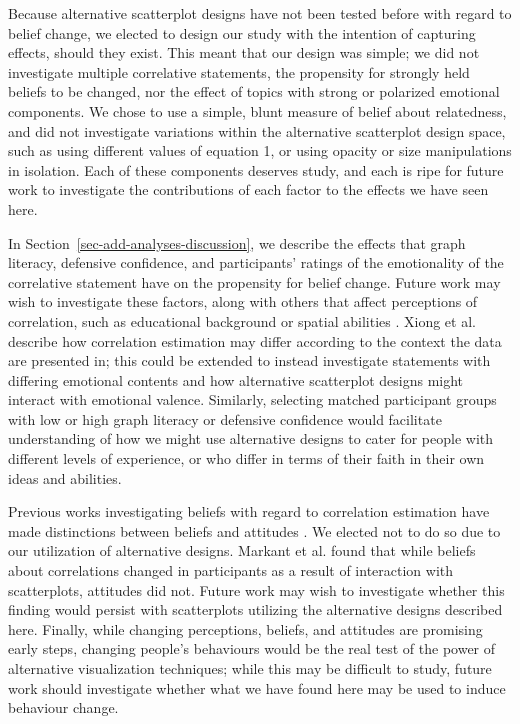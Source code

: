\documentclass[manuscript,screen,review,anonymous]{acmart}
\begin{document}
Because alternative scatterplot designs have not been tested before with
regard to belief change, we elected to design our study with the
intention of capturing effects, should they exist. This meant that our
design was simple; we did not investigate multiple correlative
statements, the propensity for strongly held beliefs to be changed, nor
the effect of topics with strong or polarized emotional components. We
chose to use a simple, blunt measure of belief about relatedness, and
did not investigate variations within the alternative scatterplot design
space, such as using different values of equation 1, or using opacity or
size manipulations in isolation. Each of these components deserves
study, and each is ripe for future work to investigate the contributions
of each factor to the effects we have seen here.

In Section~\ref{sec-add-analyses-discussion}, we describe the effects
that graph literacy, defensive confidence, and participants' ratings of
the emotionality of the correlative statement have on the propensity for
belief change. Future work may wish to investigate these factors, along
with others that affect perceptions of correlation, such as educational
background or spatial abilities \citep{tandon_2024}. Xiong et al.
\citep{xiong_2022} describe how correlation estimation may differ
according to the context the data are presented in; this could be
extended to instead investigate statements with differing emotional
contents and how alternative scatterplot designs might interact with
emotional valence. Similarly, selecting matched participant groups with
low or high graph literacy or defensive confidence would facilitate
understanding of how we might use alternative designs to cater for
people with different levels of experience, or who differ in terms of
their faith in their own ideas and abilities.

Previous works investigating beliefs with regard to correlation
estimation have made distinctions between beliefs and attitudes
\citep{xiong_2022, markant_2023}. We elected not to do so due to our
utilization of alternative designs. Markant et al. \citep{markant_2023}
found that while beliefs about correlations changed in participants as a
result of interaction with scatterplots, attitudes did not. Future work
may wish to investigate whether this finding would persist with
scatterplots utilizing the alternative designs described here. Finally,
while changing perceptions, beliefs, and attitudes are promising early
steps, changing people's behaviours would be the real test of the power
of alternative visualization techniques; while this may be difficult to
study, future work should investigate whether what we have found here
may be used to induce behaviour change.
\end{document}
